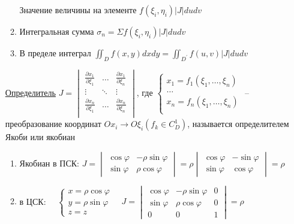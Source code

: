 \documentclass[12pt]{article}
\begin{document}
\begin{enumerate}
\begin{enumerate}
            Значение величины на элементе $f(\xi_i, \eta_i) |J| du dv$
            \item Интегральная сумма $\sigma_n = \Sigma f(\xi_i, \eta_i) |J| du dv$
            \item В пределе интеграл $\iint_D f(x, y) dx dy = \iint_{D^\prime} f(u, v) |J| du dv$
        \end{enumerate}

        \hyperlink{determinantJaсobi}{Определитель}
        $J = \begin{vmatrix}
            \frac{\partial x_1}{\partial \xi_1} & \dots  & \frac{\partial x_1}{\partial \xi_n} \\
             \vdots                              & \ddots & \vdots                              \\
             \frac{\partial x_n}{\partial \xi_1} & \dots  & \frac{\partial x_n}{\partial \xi_n} \\
        \end{vmatrix}$, где $\begin{cases}
             x_1 = f_1(\xi_1, \dots, \xi_n) \\
             \dots \\
             x_n = f_n(\xi_1, \dots, \xi_n) \\
        \end{cases}$ -- преобразование координат $Ox_i \to O\xi_i (f_k \in C^1_D)$,
        называется определителем Якоби или якобиан

        \begin{enumerate}
            \item Якобиан в ПСК: $J = \begin{vmatrix}\cos\varphi & -\rho\sin\varphi \\ \sin\varphi & \rho\cos\varphi\end{vmatrix} =
            \rho \begin{vmatrix}\cos\varphi & -\sin\varphi \\ \sin\varphi & \cos\varphi\end{vmatrix} = \rho$

            \item в ЦСК: $\quad \begin{cases}
                x = \rho\cos\varphi \\ y = \rho\sin\varphi \\ z = z
            \end{cases} \quad J = \begin{vmatrix}\cos\varphi & -\rho\sin\varphi & 0 \\ \sin\varphi & \rho\cos\varphi & 0 \\ 0 & 0 & 1\end{vmatrix} = \rho$
        \end{enumerate}


\end{enumerate}
\end{document}
